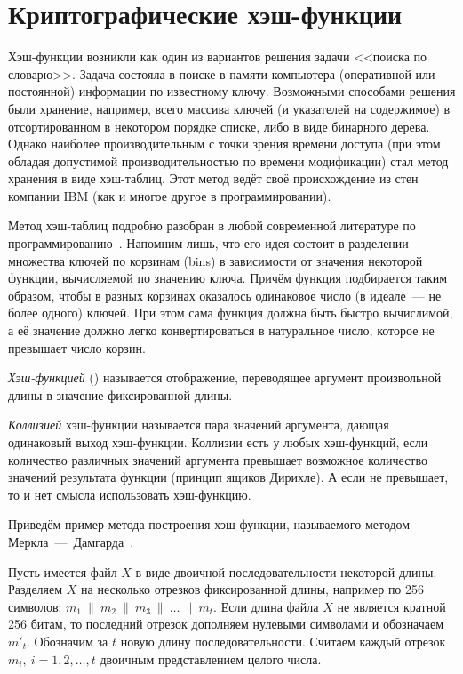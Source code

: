 \chapter{Криптографические хэш-функции}\label{chapter-hash-functions}

Хэш-функции возникли как один из вариантов решения задачи <<поиска по словарю>>. Задача состояла в поиске в памяти компьютера (оперативной или постоянной) информации по известному ключу. Возможными способами решения были хранение, например, всего массива ключей (и указателей на содержимое) в отсортированном в некотором порядке списке, либо в виде бинарного дерева. Однако наиболее производительным с точки зрения времени доступа (при этом обладая допустимой производительностью по времени модификации) стал метод хранения в виде хэш-таблиц. Этот метод ведёт своё происхождение из стен компании IBM (как и многое другое в программировании).

Метод хэш-таблиц подробно разобран в любой современной литературе по программированию~\cite{Knuth:2001:3}. Напомним лишь, что его идея состоит в разделении множества ключей по корзинам (bins) в зависимости от значения некоторой функции, вычисляемой по значению ключа. Причём функция подбирается таким образом, чтобы в разных корзинах оказалось одинаковое число (в идеале~--- не более одного) ключей. При этом сама функция должна быть быстро вычислимой, а её значение должно легко конвертироваться в натуральное число, которое не превышает число корзин.

\emph{Хэш-функцией} () называется отображение, переводящее аргумент произвольной длины в значение фиксированной длины.

\emph{Коллизией} хэш-функции называется пара значений аргумента, дающая одинаковый выход хэш-функции. Коллизии есть у любых хэш-функций, если количество различных значений аргумента превышает возможное количество значений результата функции (принцип ящиков Дирихле). А если не превышает, то и нет смысла использовать хэш-функцию.

\example
Приведём пример метода построения хэш-функции, называемого методом Меркла~---~Дамгарда~\cite{Merkle:1979, Merkle:1990, Damgard:1990}.

Пусть имеется файл $X$ в виде двоичной последовательности некоторой длины. Разделяем $X$ на несколько отрезков фиксированной длины, например по 256 символов:  $m_{1} ~\|~ m_{2} ~\|~ m_{3} ~\|~ \ldots ~\|~ m_{t}$. Если длина файла $X$ не является кратной 256 битам, то последний отрезок дополняем нулевыми символами и обозначаем $m'_{t}$.
Обозначим за $t$ новую длину последовательности. Считаем каждый отрезок $m_i, ~ i = 1, 2, \dots, t$ двоичным представлением целого числа.


